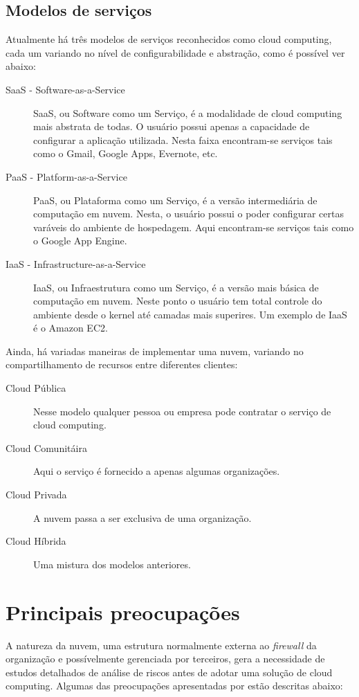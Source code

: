 \documentclass[brazil,12pt]{article}
\begin{document}
\subsection{Modelos de serviços}
Atualmente há três modelos de serviços reconhecidos como cloud computing, cada
um variando no nível de configurabilidade e abstração, como é possível ver
abaixo:

\begin{description}
  \item[SaaS - Software-as-a-Service] SaaS, ou Software como um Serviço, é a
  modalidade de cloud computing mais abstrata de todas. O usuário possui apenas
  a capacidade de configurar a aplicação utilizada. Nesta faixa encontram-se
  serviços tais como o Gmail, Google Apps, Evernote, etc.
  \item[PaaS - Platform-as-a-Service] PaaS, ou Plataforma como um Serviço, é a
  versão intermediária de computação em nuvem. Nesta, o usuário possui o poder
  configurar certas varáveis do ambiente de hospedagem. Aqui encontram-se
  serviços tais como o Google App Engine.
  \item[IaaS - Infrastructure-as-a-Service] IaaS, ou Infraestrutura como um
  Serviço, é a versão mais básica de computação em nuvem. Neste ponto o usuário
  tem total controle do ambiente desde o kernel até camadas mais superires. Um
  exemplo de IaaS é o Amazon EC2.
\end{description}

Ainda, há variadas maneiras de implementar uma nuvem, variando no
compartilhamento de recursos entre diferentes clientes:

\begin{description}
  \item[Cloud Pública] Nesse modelo qualquer pessoa ou empresa pode contratar o
  serviço de cloud computing.
  \item[Cloud Comunitáira] Aqui o serviço é fornecido a apenas algumas
  organizações.
  \item[Cloud Privada] A nuvem passa a ser exclusiva de uma organização.
  \item[Cloud Híbrida] Uma mistura dos modelos anteriores.
\end{description}

\section{Principais preocupações}
A natureza da nuvem, uma estrutura normalmente externa ao \emph{firewall} da
organização e possívelmente gerenciada por terceiros, gera a necessidade de
estudos detalhados de análise de riscos antes de adotar uma solução de cloud
computing. Algumas das preocupações apresentadas por
\cite{controlling-data-in-cloud} estão descritas abaixo:
\end{document}
